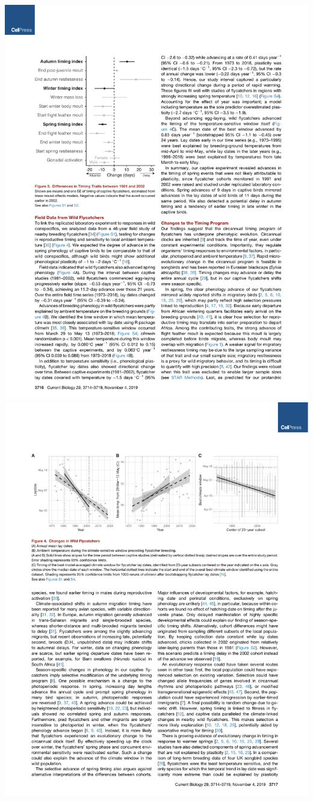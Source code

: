 \documentclass[a4paper, twoside]{templates/ociamthesis}
\begin{document}
\includegraphics[width=1\linewidth]{pdf_chapters/pied/pied_crop_Part03}
\includegraphics[width=1\linewidth]{pdf_chapters/pied/pied_crop_Part04}
\end{document}
